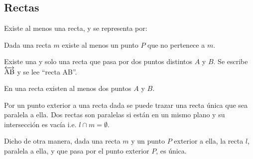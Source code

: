 \subsection{Rectas}

\begin{postulate}
    Existe al menos una recta, y se representa por:
    
    \begin{figure}[h]
        \centering
        
        \label{fig:postulate1}
    \end{figure}
\end{postulate}

\begin{postulate}
    Dada una recta $m$ existe al menos un punto $P$ que no pertenece a $m$.
    
    \begin{figure}[h]
        \centering
        
        \label{fig:postulate2}
    \end{figure}
\end{postulate}

\begin{postulate}
    Existe una y solo una recta que pasa por dos puntos distintos $A$ y $B$. Se escribe $\overleftrightarrow{\rm AB}$ y se lee ``recta AB''. 
    
    \begin{figure}[h]
        \centering
        
        \label{fig:postulate3}
    \end{figure}
\end{postulate}

\begin{postulate}
    En una recta existen al menos dos puntos $A$ y $B$.
    
    \begin{figure}[!h]
        \centering
        
        \label{fig:postulate4}
    \end{figure}
\end{postulate}

\begin{postulate}
    Por un punto exterior a una recta dada se puede trazar una recta única que sea paralela a ella. Dos rectas son paralelas si están en un mismo plano y su intersección es vacía i.e. $l \cap m = \emptyset$.
    
    \begin{figure}[!h]
        \centering
        
        \label{fig:postulate15}
    \end{figure}

    Dicho de otra manera, dada una recta $m$ y un punto $P$ exterior a ella, la recta $l$, paralela a ella, y que pasa por el punto exterior $P$, es única.
    
\end{postulate}

